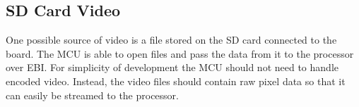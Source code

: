 \subsection{SD Card Video}
One possible source of video is a file stored on the SD card connected to the board.
The MCU is able to open files and pass the data from it to the processor over EBI.
For simplicity of development the MCU should not need to handle encoded video. Instead, the video files should contain raw pixel data so that it can easily be streamed to the processor.



